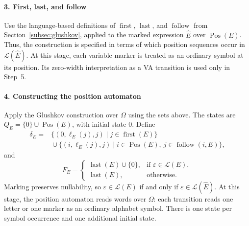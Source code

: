 \paragraph{3. First, last, and follow}
Use the language-based definitions of $\operatorname{first}$,
$\operatorname{last}$, and $\operatorname{follow}$ from
Section~\ref{subsec:glushkov}, applied to the marked expression
$\widehat{E}$ over $\operatorname{Pos}(E)$. Thus, the construction is
specified in terms of which position sequences occur in
$\mathcal L(\widehat{E})$. At this stage, each variable marker is treated
as an ordinary symbol at its position. Its zero-width interpretation as a
VA transition is used only in Step~5.

\paragraph{4. Constructing the position automaton}
Apply the Glushkov construction over $\Omega$ using the sets above.
The states are $Q_E=\{0\}\cup\operatorname{Pos}(E)$, with initial state $0$.
Define
\[
\begin{aligned}
 \delta_E={}&\{(0,\ell_E(j),j)\mid j\in\operatorname{first}(E)\}\\
            &{}\cup\{(i,\ell_E(j),j)\mid
                i\in\operatorname{Pos}(E),\ j\in\operatorname{follow}(i,E)\},
\end{aligned}
\]
and
\[
 F_E=
 \begin{cases}
   \operatorname{last}(E)\cup\{0\},&\text{if }\varepsilon \in \mathcal L(E),\\
   \operatorname{last}(E),&\text{otherwise}.
 \end{cases}
\]
Marking preserves nullability, so
$\varepsilon\in\mathcal L(E)$ if and only if
$\varepsilon\in\mathcal L(\widehat{E})$.
At this stage, the position automaton reads words over $\Omega$: each
transition reads one letter or one marker as an ordinary alphabet symbol.
There is one state per symbol occurrence and one additional initial state.

